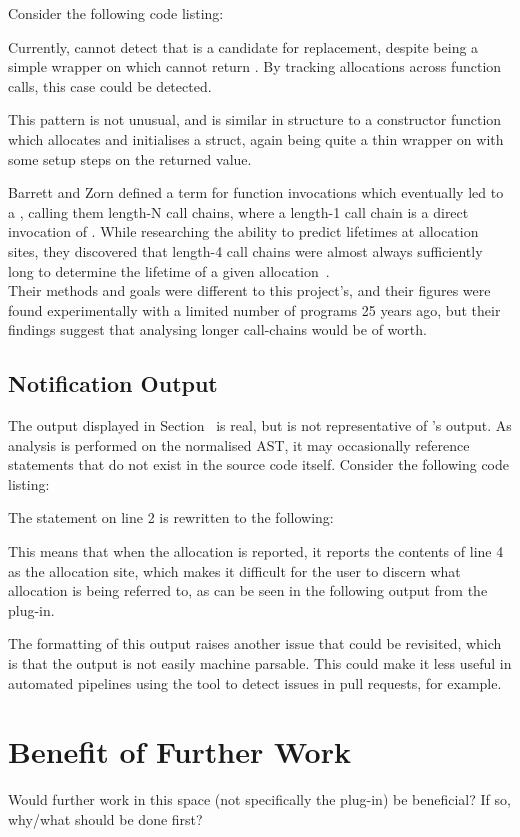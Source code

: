 Consider the following code listing:



Currently,  cannot detect that  is a candidate for replacement, despite  being a simple wrapper on \malloc{} which cannot return . By tracking allocations across function calls, this case could be detected.

This pattern is not unusual, and is similar in structure to a constructor function which allocates and initialises a struct, again being quite a thin wrapper on \malloc{} with some setup steps on the returned value.

Barrett and Zorn defined a term for function invocations which eventually led to a \malloc{}, calling them length-N call chains, where a length-1 call chain is a direct invocation of \malloc{}. While researching the ability to predict lifetimes at allocation sites, they discovered that length-4 call chains were almost always sufficiently long to determine the lifetime of a given allocation~\cite{predictors}. \\
Their methods and goals were different to this project's, and their figures were found experimentally with a limited number of programs 25 years ago, but their findings suggest that analysing longer call-chains would be of worth.

\subsection{Notification Output}

The output displayed in Section~\cite{alloctrack} is real, but is not representative of 's output. As analysis is performed on the normalised AST, it may occasionally reference statements that do not exist in the source code itself. Consider the following code listing:



The statement on line 2 is rewritten to the following:



This means that when the allocation is reported, it reports the contents of line 4 as the allocation site, which makes it difficult for the user to discern what allocation is being referred to, as can be seen in the following output from the plug-in.



The formatting of this output raises another issue that could be revisited, which is that the output is not easily machine parsable. This could make it less useful in automated pipelines using the tool to detect issues in pull requests, for example.

\section{Benefit of Further Work}

Would further work in this space (not specifically the plug-in) be beneficial? If so, why/what should be done first?
